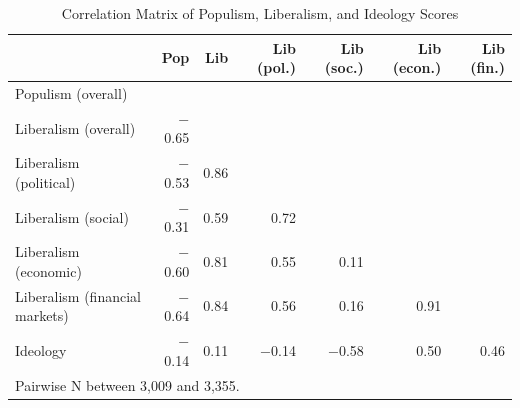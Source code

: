 \begin{table}[ht]
\caption{Correlation Matrix of Populism, Liberalism, and Ideology Scores}
\label{tab:cormatrix}
\footnotesize
\centering
\begin{tabular}{lrrrrrr}
  \toprule
 & Pop & Lib & Lib (pol.) & Lib (soc.) & Lib (econ.) & Lib (fin.)\\
  \midrule
Populism (overall) &  &  &  &  &  &  \\
Liberalism (overall) & $-$0.65 &  &  &  &  &  \\
Liberalism (political) & $-$0.53 & 0.86 &  &  &  &  \\
Liberalism (social) & $-$0.31 & 0.59 & 0.72 &  &  &  \\
Liberalism (economic) & $-$0.60 & 0.81 & 0.55 & 0.11 &  &  \\
Liberalism (financial markets) & $-$0.64 & 0.84 & 0.56 & 0.16 & 0.91 &  \\
Ideology & $-$0.14 & 0.11 & $-$0.14 & $-$0.58 & 0.50 & 0.46 \\
   \bottomrule
\multicolumn{7}{p{0.9\linewidth}}{\scriptsize Pairwise N between 3,009 and 3,355.} \\
\end{tabular}
\end{table}
